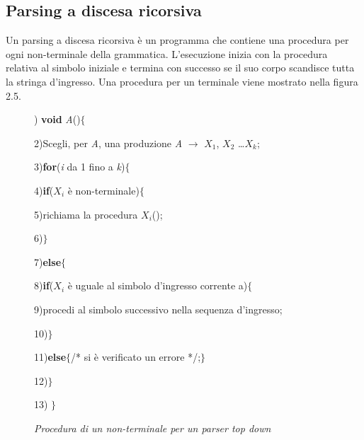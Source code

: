 \subsection{Parsing a discesa ricorsiva}
Un parsing a discesa ricorsiva è un programma che contiene una procedura per ogni non-terminale della grammatica. L'esecuzione \cite{libro: compilatori} inizia con la procedura relativa al simbolo iniziale e termina con successo se il suo corpo scandisce tutta la stringa d'ingresso. Una procedura per un terminale viene mostrato nella figura 2.5.
\begin{figure}[hbpb]
	) \textbf{void} \textit{A}()$\{$\par
	2)\hspace{0.5cm}Scegli, per \textit{A}, una produzione \textit{A} $\to$ $X_1$, $X_2$ \dots $X_k$;\par
	3)\hspace{0.5cm}\textbf{for}(\textit{i} da 1 fino a \textit{k})$\{$\par
	4)\hspace{1.1cm}\textbf{if}($X_i$ è non-terminale)$\{$\par
	5)\hspace{1.4cm}richiama la procedura $X_i$();\par
	6)\hspace{1.1cm}$\}$\par		
	7)\hspace{1.1cm}\textbf{else}$\{$\par	
	8)\hspace{1.3cm}\textbf{if}($X_i$ è uguale al simbolo d'ingresso corrente a)$\{$\par
	9)\hspace{2.0cm}procedi al simbolo successivo nella sequenza d'ingresso;\par
   10)\hspace{1.3cm}$\}$\par
   11)\hspace{1.4cm}\textbf{else}$\{$/* si è verificato un errore */;$\}$\par
   12)\hspace{0.5cm}$\}$\par
   13) $\}$\par
	\caption{\textit{Procedura di un non-terminale per un parser top down}}\label{fig:code}
\end{figure}

